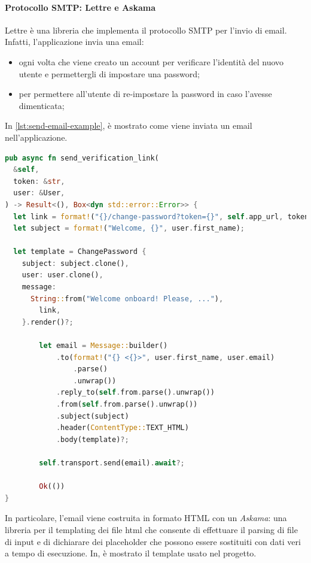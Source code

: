 \documentclass{article}
\begin{document}
\paragraph{Protocollo SMTP: Lettre e Askama} Lettre è una libreria che implementa il protocollo SMTP 
per l'invio di email. Infatti, l'applicazione invia una email:
\begin{itemize}
  \item ogni volta che viene creato un account per verificare l'identità del nuovo
    utente e permettergli di impostare una password;
  \item per permettere all'utente di re-impostare la password in caso l'avesse dimenticata;
\end{itemize}

In \cref{lst:send-email-example}, è mostrato come viene inviata un email nell'applicazione. 

\begin{lstlisting}[language=Rust, style=boxed, label={lst:send-email-example}, captionpos=b,caption={Esempio di invio email in Rust con Lettre}]
pub async fn send_verification_link(
  &self,
  token: &str,
  user: &User,
) -> Result<(), Box<dyn std::error::Error>> {
  let link = format!("{}/change-password?token={}", self.app_url, token);
  let subject = format!("Welcome, {}", user.first_name);

  let template = ChangePassword {
    subject: subject.clone(),
    user: user.clone(),
    message:
      String::from("Welcome onboard! Please, ..."),
        link,
    }.render()?;

        let email = Message::builder()
            .to(format!("{} <{}>", user.first_name, user.email)
                .parse()
                .unwrap())
            .reply_to(self.from.parse().unwrap())
            .from(self.from.parse().unwrap())
            .subject(subject)
            .header(ContentType::TEXT_HTML)
            .body(template)?;

        self.transport.send(email).await?;

        Ok(())
}

\end{lstlisting}
In particolare, l'email viene costruita in formato HTML con un \textit{Askama}: una libreria 
per il templating dei file html che consente di effettuare il parsing di file di input e di 
dichiarare dei placeholder che possono essere sostituiti con dati veri a tempo di esecuzione.  
In, è mostrato il template usato nel progetto. 
\end{document}
